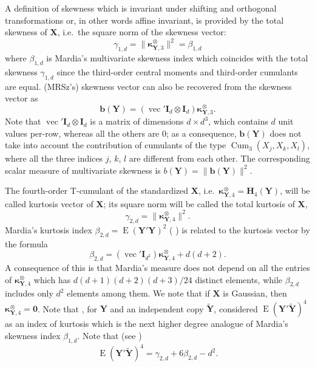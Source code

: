 A definition of skewness which is invariant under shifting and orthogonal transformations or, in other words affine invariant, is provided by the total skewness of \(\mathbf{X}\), i.e.~the square norm of the skewness vector:
\begin{equation}
\gamma_{1,d}=\|\boldsymbol{\kappa}_{\mathbf{Y},3}^\otimes\|^2 = \beta_{1,d}
\end{equation}
where \(\beta_{1,d}\) is Mardia's multivariate skewness index \citep{Mardia70} which coincides with the total skewness \(\gamma_{1,d}\) since the third-order central moments and third-order cumulants are equal. \citet{mori1994multivariate} (MRSz's) skewness vector can also be recovered from the skewness vector as
\begin{equation}
\mathbf{b}(\mathbf{Y})= \left( \operatorname{vec}' \mathbf{I}_d \otimes  \mathbf{I}_d \right)\boldsymbol{\kappa}_{\mathbf{Y},3}^\otimes.
\label{eq:MoriSkew}
\end{equation}
Note that \(\operatorname{vec}' \mathbf{I}_d \otimes \mathbf{I}_d\) is a matrix of dimensions \(d \times d^3\), which contains \(d\) unit values per-row,
whereas all the others are 0; as a consequence, \(\mathbf{b}(\mathbf{Y})\) does not take into account the contribution of cumulants of the type \(\operatorname{Cum}_3 (X_j,X_k,X_l)\), where all the
three indices \(j\), \(k\), \(l\) are different from each other. The corresponding scalar measure of multivariate skewness is \(b(\mathbf{Y}) = \| \mathbf{b}(\mathbf{Y}) \|^2\).

The fourth-order T-cumulant of the standardized \(\mathbf{X}\), i.e.~\(\boldsymbol{\kappa}_{\mathbf{Y},4}^\otimes =\mathbf{H}_4(\mathbf{Y})\), will be called kurtosis vector of \(\mathbf{X}\); its square norm will be called the total kurtosis of \(\mathbf{X}\),
\begin{equation}
\gamma_{2,d}=\| \boldsymbol{\kappa}_{\mathbf{Y},4}^\otimes \|^2.
\end{equation}
Mardia's kurtosis index \(\beta_{2,d}= \operatorname{E}\left( \mathbf{Y}'\mathbf{Y} \right)^2\) ( \citet{Mardia70}) is related to the kurtosis vector by the formula
\[
\beta_{2,d}= \left( \operatorname{vec}' \mathbf{I}_{d^2} \right)\boldsymbol{\kappa}_{\mathbf{Y},4}^\otimes +d(d+2).
\]
A consequence of this is that Mardia's measure does not depend on all the entries of \(\boldsymbol{\kappa}_{\mathbf{Y},4}^\otimes\)
which has \(d(d +1)(d +2)(d +3)/24\) distinct elements, while \(\beta_{2,d}\) includes only \(d^2\) elements among them. We note that if \(\mathbf{X}\) is Gaussian, then \(\boldsymbol{\kappa}_{\mathbf{Y},4}^\otimes=\mathbf{0}\). Note that \citet{koziol1989}, for \(\mathbf{Y}\) and an independent copy \(\tilde{\mathbf{Y}}\), considered \(\operatorname{E}(\mathbf{Y}'\tilde{\mathbf{Y}})^4\) as an index of kurtosis which is the next higher degree analogue of Mardia's skewness index \(\beta_{1,d}\). Note that (see \citet{jamma2021San})
\[
\operatorname{E}(\mathbf{Y}'\tilde{\mathbf{Y}})^4 = \gamma_{2,d}+6 \beta_{2,d}-d^2.
\]

